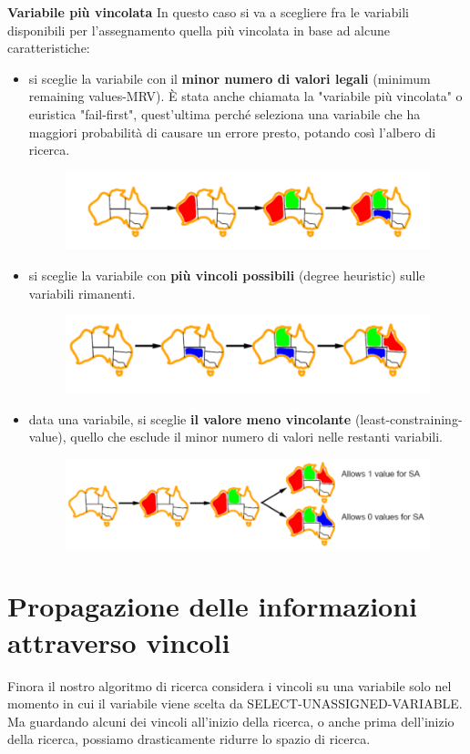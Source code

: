 \newpage
\textbf{Variabile più vincolata } In questo caso si va a scegliere fra le variabili disponibili per l’assegnamento quella più vincolata in base ad alcune caratteristiche:
\begin{itemize}
    \item si sceglie la variabile con il \textbf{minor numero di valori legali} (minimum remaining values-MRV). È stata anche chiamata la "variabile più vincolata" o euristica "fail-first", quest’ultima perché seleziona una variabile che ha maggiori probabilità di causare un errore presto, potando così l’albero di ricerca.
    \begin{figure}[htp]
    	\centering
        \includegraphics[width=12cm, keepaspectratio]{img/Cap2/m1.png}
    \end{figure}
    \item si sceglie la variabile con \textbf{più vincoli possibili} (degree heuristic) sulle variabili rimanenti.
    \begin{figure}[htp]
    	\centering
        \includegraphics[width=12cm, keepaspectratio]{img/Cap2/m2.png}
    \end{figure}
    \item data una variabile, si sceglie \textbf{il valore meno vincolante} (least-constraining-value), quello che esclude il minor numero di valori nelle restanti variabili.
    \begin{figure}[htp]
    	\centering
        \includegraphics[width=12cm, keepaspectratio]{img/Cap2/m3.png}
    \end{figure}
\end{itemize}
\newpage
\section{Propagazione delle informazioni attraverso vincoli}
Finora il nostro algoritmo di ricerca considera i vincoli su una variabile solo nel momento in cui il variabile viene scelta da SELECT-UNASSIGNED-VARIABLE. Ma guardando alcuni dei vincoli all’inizio della ricerca, o anche prima dell’inizio della ricerca, possiamo drasticamente ridurre lo spazio di ricerca.
